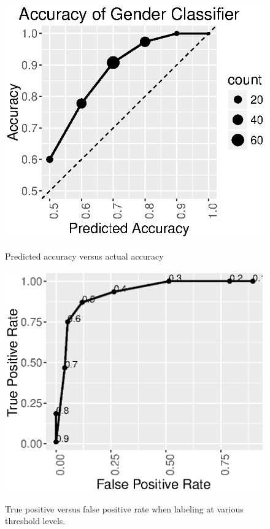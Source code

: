 \begin{figure}[h]
  \centering
  \begin{minipage}{.21\textwidth}
    \centering
    \includegraphics[width=\linewidth]{fig/census/accuracy_gender.eps}
    \caption{Predicted accuracy versus actual accuracy }
    \label{fig:accuracy_gender}
  \end{minipage}
  \begin{minipage}{.21\textwidth}
    \centering
    \includegraphics[width=\linewidth]{fig/census/roc_gender.eps}
    \caption{True positive versus false positive rate when labeling at various threshold levels.}
    \label{fig:roc_gender}
  \end{minipage}
  \caption{}
  \label{fig:accuracy_gender_all}
\end{figure}

